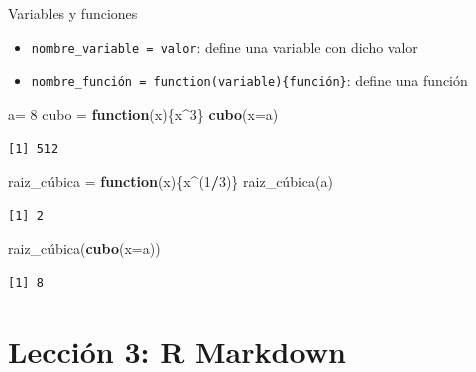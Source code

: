 \documentclass[
  ignorenonframetext,
  aspectratio=169]{beamer}
\newenvironment{Shaded}{\begin{snugshade}}{\end{snugshade}}
\newcommand{\AttributeTok}[1]{\textcolor[rgb]{0.13,0.29,0.53}{#1}}
\newcommand{\ControlFlowTok}[1]{\textcolor[rgb]{0.13,0.29,0.53}{\textbf{#1}}}
\newcommand{\DecValTok}[1]{\textcolor[rgb]{0.00,0.00,0.81}{#1}}
\newcommand{\FunctionTok}[1]{\textcolor[rgb]{0.13,0.29,0.53}{\textbf{#1}}}
\newcommand{\NormalTok}[1]{#1}
\newcommand{\OtherTok}[1]{\textcolor[rgb]{0.56,0.35,0.01}{#1}}
\newcommand{\SpecialCharTok}[1]{\textcolor[rgb]{0.81,0.36,0.00}{\textbf{#1}}}
\providecommand{\tightlist}{%
  \setlength{\itemsep}{0pt}\setlength{\parskip}{0pt}}
\begin{document}
\begin{frame}[fragile]{Variables y funciones}
\label{variables-y-funciones}
\begin{itemize}
\tightlist
\item
  \texttt{nombre\_variable\ =\ valor}: define una variable con dicho
  valor
\item
  \texttt{nombre\_función\ =\ function(variable)\{función\}}: define una
  función
\end{itemize}

\begin{Shaded}
\begin{Highlighting}[]
\NormalTok{a}\OtherTok{=} \DecValTok{8}
\NormalTok{cubo }\OtherTok{=} \ControlFlowTok{function}\NormalTok{(x)\{x}\SpecialCharTok{\^{}}\DecValTok{3}\NormalTok{\}}
\FunctionTok{cubo}\NormalTok{(}\AttributeTok{x=}\NormalTok{a)}
\end{Highlighting}
\end{Shaded}

\begin{verbatim}
[1] 512
\end{verbatim}

\begin{Shaded}
\begin{Highlighting}[]
\NormalTok{raiz\_cúbica }\OtherTok{=} \ControlFlowTok{function}\NormalTok{(x)\{x}\SpecialCharTok{\^{}}\NormalTok{(}\DecValTok{1}\SpecialCharTok{/}\DecValTok{3}\NormalTok{)\}}
\NormalTok{raiz\_cúbica(a)}
\end{Highlighting}
\end{Shaded}

\begin{verbatim}
[1] 2
\end{verbatim}

\begin{Shaded}
\begin{Highlighting}[]
\NormalTok{raiz\_cúbica(}\FunctionTok{cubo}\NormalTok{(}\AttributeTok{x=}\NormalTok{a))}
\end{Highlighting}
\end{Shaded}

\begin{verbatim}
[1] 8
\end{verbatim}
\end{frame}

\section{Lección 3: R Markdown}\label{lecciuxf3n-3-r-markdown}
\end{document}

